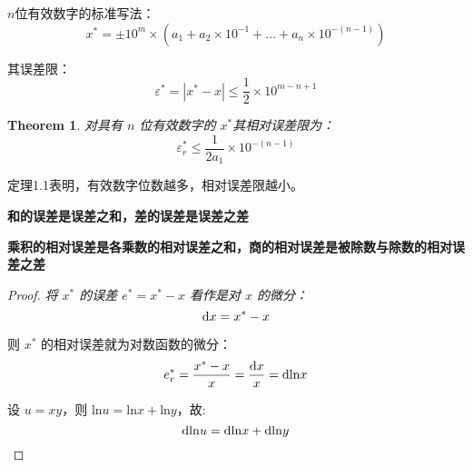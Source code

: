 	$n$位有效数字的标准写法：
	\begin{equation}
	x^* = \pm 10^m \times (a_1 +a_2\times 10^{-1}+\dots + a_n\times 10^{-(n-1)})
	\end{equation}
	
	其误差限：
	\begin{equation}
	\varepsilon^* = \left| x^* - x\right| \le \frac{1}{2} \times 10^{m-n+1}
	\end{equation}
	
	\newtheorem{mythm}{Theorem}[chapter]
	\begin{mythm}
	对具有 $n$ 位有效数字的 $x^*$其相对误差限为：
	\begin{equation}
	\varepsilon^*_r \le \frac{1}{2a_1} \times 10^{-(n-1)}
	\end{equation}
	\end{mythm}

	定理1.1表明，有效数字位数越多，相对误差限越小。
	
	\textbf{和的误差是误差之和，差的误差是误差之差}
	
	\textbf{乘积的相对误差是各乘数的相对误差之和，商的相对误差是被除数与除数的相对误差之差}

	\begin{proof}{\em
	将 $x^*$ 的误差 $e^* = x^* - x$ 看作是对 $x$ 的微分：
	\begin{equation}
	\mathrm{d} x = x^* - x \notag
	\end{equation}
	
	则 $x^*$ 的相对误差就为对数函数的微分：
	\begin{equation}
	e^*_r = \frac{x^* - x}{x} = \frac{\mathrm{d}x}{x}=\mathrm{dln}x \notag
	\end{equation}
	
	设 $u=xy$，则 $\mathrm{ln}u = \mathrm{ln}x + \mathrm{ln}y$，故:
	$$
	\mathrm{dln}u = \mathrm{dln}x + \mathrm{dln}y \notag 
	$$}
	\end{proof}
	\newpage
	
